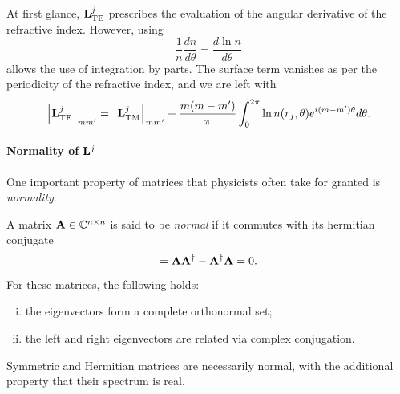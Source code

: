 At first glance, $\mathbf{L}^j_\text{TE}$ prescribes the evaluation of
the angular derivative of the refractive index. However, 
using 
	\begin{equation}
		\frac{1}{n}\frac{dn}{d\theta} = \frac{d\ln n}{d\theta}
	\end{equation}
allows the use of integration by parts. The surface term 
vanishes as per the periodicity of the refractive index, and we 
are left with 
	\begin{equation}
		\left[\mathbf{L}^j_\text{TE}\right]_{mm'} = \left[\mathbf{L}^j_\text{TM}\right]_{mm'}
						+\frac{m(m-m')}{\pi}\int_0^{2\pi}\ln n(r_j,\theta) e^{i(m-m')\theta}d\theta.
	\end{equation}

\paragraph{Normality of $\mathbf{L}^j$}
One important property of matrices that physicists often 
take for granted is \textit{normality}.

\begin{defn}
	A matrix $\mathbf{A}\in\mathbb{C}^{n\times n}$ is said to be \textit{normal}
	if it commutes with its hermitian conjugate
		\begin{equation}
			[\mat{A},\mat{A}^\dagger]=\mat{A}\mat{A}^\dagger-\mat{A}^\dagger\mat{A} =0.
		\end{equation}
	For these matrices, the following holds:
		\begin{enumerate}[(i)]
			\item the eigenvectors form a complete orthonormal set; 
			\item the left and right eigenvectors are related via complex conjugation.
		\end{enumerate}
\end{defn}

Symmetric and Hermitian matrices are necessarily normal, with the additional
property that their spectrum is real. 

